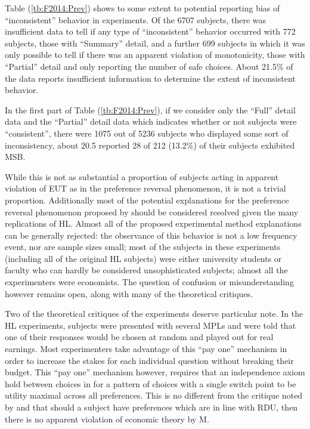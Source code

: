 \documentclass[11pt,a4paper]{report}
\begin{document}
Table (\ref{tb:F2014:Prev}) shows to some extent to potential reporting bias of \enquote{inconsistent} behavior in experiments.
Of the 6707 subjects, there was insufficient data to tell if any type of \enquote{inconsistent} behavior occurred with 772 subjects, those with \enquote{Summary} detail, and a further 699 subjects in which it was only possible to tell if there was an apparent violation of monotonicity, those with \enquote{Partial} detail and only reporting the number of safe choices.
About 21.5\% of the data reports insufficient information to determine the extent of inconsistent behavior.

In the first part of Table (\ref{tb:F2014:Prev}), if we consider only the \enquote{Full} detail data and the \enquote{Partial} detail data which indicates whether or not subjects were \enquote{consistent}, there were 1075 out of 5236 subjects who displayed some sort of inconsistency, about 20.5%
\textcite[1647]{Holt2002} reported 28 of 212 (13.2\%) of their subjects exhibited MSB.

While this is not as substantial a proportion of subjects acting in apparent violation of EUT as in the \textcite{Grether1979} preference reversal phenomenon, it is not a trivial proportion.
Additionally most of the potential explanations for the preference reversal phenomenon proposed by \textcite{Grether1979} should be considered resolved given the many replications of HL.
Almost all of the proposed experimental method explanations can be generally rejected: the observance of this behavior is not a low frequency event, nor are sample sizes small; most of the subjects in these experiments (including all of the original HL subjects) were either university students or faculty who can hardly be considered unsophisticated subjects; almost all the experimenters were economists.
The question of confusion or misunderstanding however remains open, along with many of the theoretical critiques.

Two of the theoretical critiques of the \textcite{Grether1979} experiments deserve particular note.
In the HL experiments, subjects were presented with several MPLs and were told that one of their responses would be chosen at random and played out for real earnings.
Most experimenters take advantage of this \enquote{pay one} mechanism in order to increase the stakes for each individual question without breaking their budget.
This \enquote{pay one} mechanism however, requires that an independence axiom hold between choices in for a pattern of choices with a single switch point to be utility maximal across all preferences.
This is no different from the critique noted by \textcite{Holt1986} and \textcite{Karni1987} that should a subject have preferences which are in line with RDU, then there is no apparent violation of economic theory by M.
\end{document}
